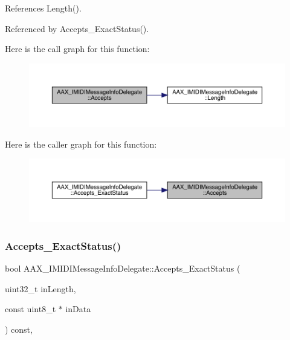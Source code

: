 References Length().



Referenced by Accepts\+\_\+\+Exact\+Status().

Here is the call graph for this function\+:
\nopagebreak
\begin{figure}[H]
\begin{center}
\leavevmode
\includegraphics[width=350pt]{a01953_a293e390875d91b5dc0ff51e847aa886c_cgraph}
\end{center}
\end{figure}
Here is the caller graph for this function\+:
\nopagebreak
\begin{figure}[H]
\begin{center}
\leavevmode
\includegraphics[width=350pt]{a01953_a293e390875d91b5dc0ff51e847aa886c_icgraph}
\end{center}
\end{figure}
\mbox{\label{a01953_a309f83a83541ce2b1f429ae2d009616c}} 
\subsubsection{\texorpdfstring{Accepts\_ExactStatus()}{Accepts\_ExactStatus()}}
{\footnotesize\ttfamily bool A\+A\+X\+\_\+\+I\+M\+I\+D\+I\+Message\+Info\+Delegate\+::\+Accepts\+\_\+\+Exact\+Status (\begin{DoxyParamCaption}\item[{uint32\+\_\+t}]{in\+Length,  }\item[{const uint8\+\_\+t $\ast$}]{in\+Data }\end{DoxyParamCaption}) const\hspace{0.3cm}{\ttfamily [inline]}, {\ttfamily [protected]}}



